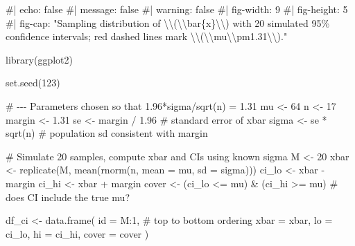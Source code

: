 \documentclass[
  letterpaper,
  DIV=11,
  numbers=noendperiod]{scrreprt}
\newenvironment{Shaded}{\begin{snugshade}}{\end{snugshade}}
\newcommand{\AttributeTok}[1]{\textcolor[rgb]{0.40,0.45,0.13}{#1}}
\newcommand{\CommentTok}[1]{\textcolor[rgb]{0.37,0.37,0.37}{#1}}
\newcommand{\DecValTok}[1]{\textcolor[rgb]{0.68,0.00,0.00}{#1}}
\newcommand{\FloatTok}[1]{\textcolor[rgb]{0.68,0.00,0.00}{#1}}
\newcommand{\FunctionTok}[1]{\textcolor[rgb]{0.28,0.35,0.67}{#1}}
\newcommand{\NormalTok}[1]{\textcolor[rgb]{0.00,0.23,0.31}{#1}}
\newcommand{\OtherTok}[1]{\textcolor[rgb]{0.00,0.23,0.31}{#1}}
\newcommand{\SpecialCharTok}[1]{\textcolor[rgb]{0.37,0.37,0.37}{#1}}
\begin{document}
\begin{Shaded}
\begin{Highlighting}[]
\CommentTok{\#| echo: false}
\CommentTok{\#| message: false}
\CommentTok{\#| warning: false}
\CommentTok{\#| fig{-}width: 9}
\CommentTok{\#| fig{-}height: 5}
\CommentTok{\#| fig{-}cap: "Sampling distribution of \textbackslash{}\textbackslash{}(\textbackslash{}\textbackslash{}bar\{x\}\textbackslash{}\textbackslash{}) with 20 simulated 95\% confidence intervals; red dashed lines mark \textbackslash{}\textbackslash{}(\textbackslash{}\textbackslash{}mu\textbackslash{}\textbackslash{}pm1.31\textbackslash{}\textbackslash{})."}

\FunctionTok{library}\NormalTok{(ggplot2)}

\FunctionTok{set.seed}\NormalTok{(}\DecValTok{123}\NormalTok{)}

\CommentTok{\# {-}{-}{-} Parameters chosen so that 1.96*sigma/sqrt(n) = 1.31}
\NormalTok{mu    }\OtherTok{\textless{}{-}} \DecValTok{64}
\NormalTok{n     }\OtherTok{\textless{}{-}} \DecValTok{17}
\NormalTok{margin }\OtherTok{\textless{}{-}} \FloatTok{1.31}
\NormalTok{se    }\OtherTok{\textless{}{-}}\NormalTok{ margin }\SpecialCharTok{/} \FloatTok{1.96}               \CommentTok{\# standard error of xbar}
\NormalTok{sigma }\OtherTok{\textless{}{-}}\NormalTok{ se }\SpecialCharTok{*} \FunctionTok{sqrt}\NormalTok{(n)                 }\CommentTok{\# population sd consistent with margin}

\CommentTok{\# Simulate 20 samples, compute xbar and CIs using known sigma}
\NormalTok{M }\OtherTok{\textless{}{-}} \DecValTok{20}
\NormalTok{xbar   }\OtherTok{\textless{}{-}} \FunctionTok{replicate}\NormalTok{(M, }\FunctionTok{mean}\NormalTok{(}\FunctionTok{rnorm}\NormalTok{(n, }\AttributeTok{mean =}\NormalTok{ mu, }\AttributeTok{sd =}\NormalTok{ sigma)))}
\NormalTok{ci\_lo  }\OtherTok{\textless{}{-}}\NormalTok{ xbar }\SpecialCharTok{{-}}\NormalTok{ margin}
\NormalTok{ci\_hi  }\OtherTok{\textless{}{-}}\NormalTok{ xbar }\SpecialCharTok{+}\NormalTok{ margin}
\NormalTok{cover  }\OtherTok{\textless{}{-}}\NormalTok{ (ci\_lo }\SpecialCharTok{\textless{}=}\NormalTok{ mu) }\SpecialCharTok{\&}\NormalTok{ (ci\_hi }\SpecialCharTok{\textgreater{}=}\NormalTok{ mu)  }\CommentTok{\# does CI include the true mu?}

\NormalTok{df\_ci }\OtherTok{\textless{}{-}} \FunctionTok{data.frame}\NormalTok{(}
  \AttributeTok{id    =}\NormalTok{ M}\SpecialCharTok{:}\DecValTok{1}\NormalTok{,                 }\CommentTok{\# top to bottom ordering}
  \AttributeTok{xbar  =}\NormalTok{ xbar,}
  \AttributeTok{lo    =}\NormalTok{ ci\_lo,}
  \AttributeTok{hi    =}\NormalTok{ ci\_hi,}
  \AttributeTok{cover =}\NormalTok{ cover}
\NormalTok{)}


\end{Highlighting}
\end{Shaded}
\end{document}
